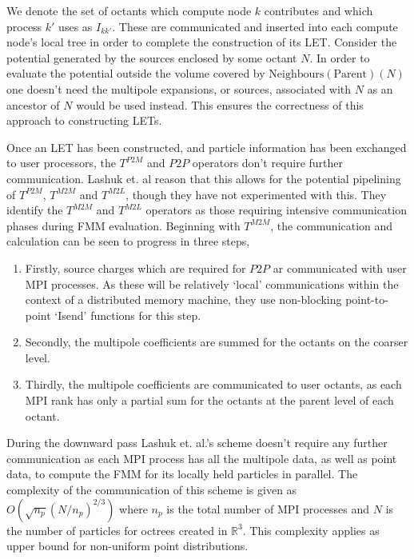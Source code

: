 We denote the set of octants which compute node $k$ contributes and which process $k'$ uses as $I_{k k'}$. These are communicated and inserted into each compute node's local tree in order to complete the construction of its LET. Consider the potential generated by the sources enclosed by some octant $N$. In order to evaluate the potential outside the volume covered by $\text{Neighbours}(\text{Parent})(N)$ one doesn't need the multipole expansions, or sources, associated with $N$ as an ancestor of $N$ would be used instead. This ensures the correctness of this approach to constructing LETs.

Once an LET has been constructed, and particle information has been exchanged to user processors, the $T^{P2M}$ and $P2P$ operators don't require further communication. Lashuk et. al reason that this allows for the potential pipelining of $T^{P2M}$, $T^{M2M}$ and $T^{M2L}$, though they have not experimented with this. They identify the $T^{M2M}$ and $T^{M2L}$ operators as those requiring intensive communication phases during FMM evaluation. Beginning with $T^{M2M}$, the communication and calculation can be seen to progress in three steps,

\begin{enumerate}
    \item Firstly, source charges which are required for $P2P$ ar communicated with user MPI processes. As these will be relatively `local' communications within the context of a distributed memory machine, they use non-blocking point-to-point `Isend' functions for this step.
    \item Secondly, the multipole coefficients are summed for the octants on the coarser level.
    \item Thirdly, the multipole coefficients are communicated to user octants, as each MPI rank has only a partial sum for the octants at the parent level of each octant.
\end{enumerate}

During the downward pass Lashuk et. al.'s scheme doesn't require any further communication as each MPI process has all the multipole data, as well as point data, to compute the FMM for its locally held particles in parallel. The complexity of the communication of this scheme is given as $O(\sqrt{n_p}(N/n_p)^{2/3})$ where $n_p$ is the total number of MPI processes and $N$ is the number of particles for octrees created in $\mathbb{R}^3$. This complexity applies as upper bound for non-uniform point distributions.

